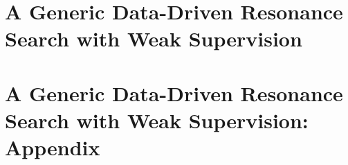 \documentclass[12pt]{report}
\begin{document}
\chapter{A Generic Data-Driven Resonance Search with Weak Supervision}
\label{ch:CWoLa}
%
%
%
%
%
\chapter{A Generic Data-Driven Resonance Search with Weak Supervision: Appendix}
\label{ch:CWoLa_app}


 
  
{}
\end{document}
